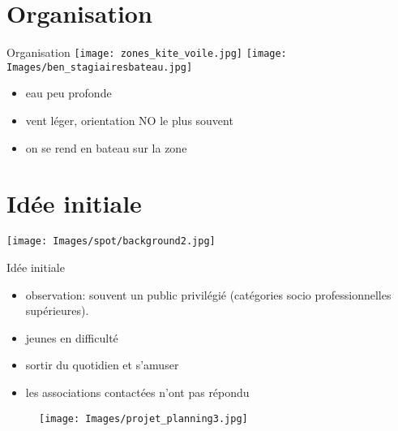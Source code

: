 \documentclass[10pt,a4paper]{beamer}
\begin{document}
\section{Organisation}
\begin{frame}{Organisation}
\texttt{[image: zones\_kite\_voile.jpg]} 
\texttt{[image: Images/ben\_stagiairesbateau.jpg]} 
\begin{itemize}
\item eau peu profonde
\item vent léger, orientation NO le plus souvent
\item on se rend en bateau sur la zone
\end{itemize}
\end{frame}

\section{Idée initiale}
{
{
   \texttt{[image: Images/spot/background2.jpg]}
}
\begin{frame}{Idée initiale}
\begin{itemize}
\item observation: souvent un public privilégié (catégories socio professionnelles supérieures).
\item  jeunes en difficulté
\item  sortir du quotidien et s'amuser
\item les associations contactées n'ont pas répondu
\end{itemize}
\begin{figure}
\texttt{[image: Images/projet\_planning3.jpg]} 
\end{figure}
\end{frame}
}


\end{document}
